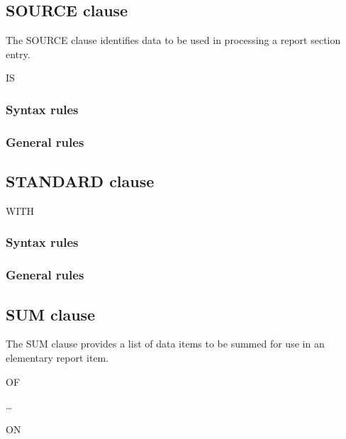 \subsection{SOURCE clause}

The SOURCE clause identifies data to be used in processing a report section entry.

\begin{syntax}
   IS 
  \begin{0-1}
  \end{0-1}
\end{syntax}

\subsubsection{Syntax rules}

\subsubsection{General rules}

\subsection{STANDARD clause}

\begin{syntax}[\miscextcolour]
  WITH 
\end{syntax}

\subsubsection{Syntax rules}

\subsubsection{General rules}

\subsection{SUM clause}

The SUM clause provides a list of data items to be summed for use in an elementary report item.

\begin{syntax}
   OF
  \begin{1=}
  \end{1=}\ldots
  \begin{0-1}
    \begin{1=}
       ON
      \begin{1=}
        \identifier \\
      \end{1=} \\

       \identifier
  \end{1=}
  \end{0-1}
\end{syntax}

